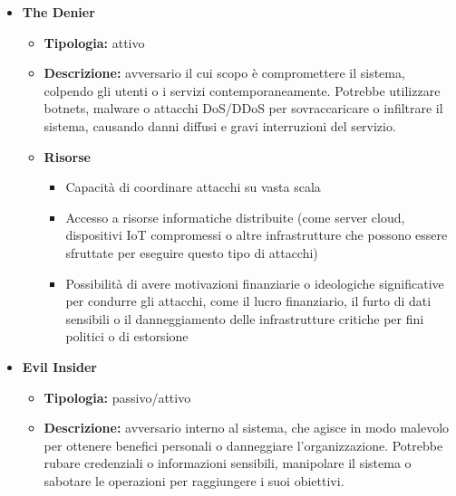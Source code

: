 \begin{itemize}
            \item \textbf{The Denier}
                \begin{itemize}
                    \item \textbf{Tipologia:} attivo
                    
                    \item \textbf{Descrizione:} avversario il cui scopo è compromettere il sistema, colpendo gli utenti o i servizi contemporaneamente.
                    Potrebbe utilizzare botnets, malware o attacchi DoS/DDoS per sovraccaricare o infiltrare il sistema, causando danni diffusi e gravi interruzioni del servizio.
                    
                    \item \textbf{Risorse}
                        \begin{itemize}
                            \item Capacità di coordinare attacchi su vasta scala
    
                            \vspace{3mm}
    
                            \item Accesso a risorse informatiche distribuite (come server cloud, dispositivi IoT compromessi o altre infrastrutture che possono essere sfruttate per eseguire questo tipo di attacchi)
    
                            \vspace{3mm}
    
                            \item Possibilità di avere motivazioni finanziarie o ideologiche significative per condurre gli attacchi, come il lucro finanziario, il furto di dati sensibili o il danneggiamento delle infrastrutture critiche per fini politici o di estorsione
                        \end{itemize}
                \end{itemize}
    
            \item \textbf{Evil Insider}
                \begin{itemize}
                    \item \textbf{Tipologia:} passivo/attivo
                    
                    \item \textbf{Descrizione:} avversario interno al sistema, che agisce in modo malevolo per ottenere benefici personali o danneggiare l'organizzazione.
                    Potrebbe rubare credenziali o informazioni sensibili, manipolare il sistema o sabotare le operazioni per raggiungere i suoi obiettivi.
                    

\end{itemize}
\end{itemize}
